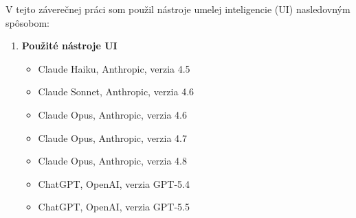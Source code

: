 V tejto záverečnej práci som použil nástroje umelej inteligencie (UI) nasledovným spôsobom:

\begin{enumerate}
    \item \textbf{Použité nástroje UI}
          \begin{itemize}
              \item{Claude Haiku, Anthropic, verzia 4.5}
              \item{Claude Sonnet, Anthropic, verzia 4.6}
              \item{Claude Opus, Anthropic, verzia 4.6}
              \item{Claude Opus, Anthropic, verzia 4.7}
              \item{Claude Opus, Anthropic, verzia 4.8}
              \item{ChatGPT, OpenAI, verzia GPT-5.4}
              \item{ChatGPT, OpenAI, verzia GPT-5.5}
          \end{itemize}


\end{enumerate}
